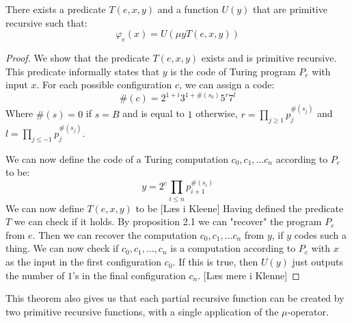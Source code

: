 \documentclass[../main.tex]{subfiles}
\begin{document}
\begin{thm}
	\label{thm:Normalform}
	There exists a predicate $T(e,x,y)$ and a function $U(y)$ that are
	primitive recursive such that:
	$$\varphi_e(x)=U(\mu yT(e,x,y))$$
\end{thm}
\begin{proof}
	We show that the predicate $T(e,x,y)$ exists and is primitive
	recursive. This predicate informally
	states that $y$ is the code of Turing program $P_e$ with input $x$. For
	each possible configuration $c$, we can assign a code:
	$$\#(c)=2^{1+i}3^{1+\#(s_0)}5^r7^l$$
	Where $\#(s)=0$ if $s=B$ and is equal to $1$ otherwise, $r=\prod_{j\geq
	1}p_j^{\#(s_j)}$ and $l=\prod_{j\leq -1}p_j^{\#(s_j)}$.


	 We can now define the code of a Turing computation
	$c_0,c_1,\ldots c_n$ according to $P_e$ to be:
	$$y=2^e\prod_{i\leq n}p_{i+1}^{\#(s_i)}$$
	We can now define $T(e,x,y)$ to be [Læs i Kleene]
	Having defined the predicate $T$ we can check if it holds. By
	proposition 2.1 we can "recover" the program $P_e$ from $e$. Then we
	can recover the computation $c_0,c_1,\ldots c_n$ from $y$, if $y$ codes
	such a thing. We can now check if $c_0,c_1,\ldots,c_n$ is a computation
	according to $P_e$ with $x$ as the input in the first configuration
	$c_0$. If this is true, then $U(y)$ just outputs the number of $1$'s in
	the final configuration $c_n$. [Læs mere i Klenne]
\end{proof}
This theorem also gives us that each partial recursive function can be created
by two primitive recursive functions, with a single application of the
$\mu$-operator.
\end{document}
